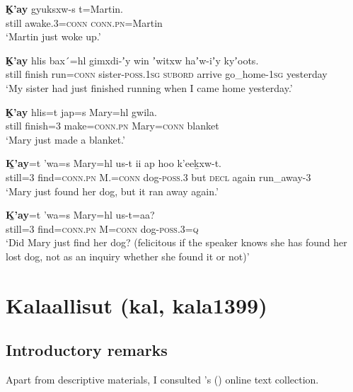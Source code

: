 \begin{exe}
	\ex\label{exGitsxanNearPast1}
	\gll \textbf{K̠'ay} gyuksxw-s t=Martin.\\
	still awake.3=\textsc{conn} \textsc{conn}.\textsc{pn}=Martin\\
	\glt \lq Martin just woke up.' \parencite[140]{Hunt1993}

	\ex\label{exGitsxanNearPast2}
	\gll \textbf{K̠'ay} hlis bax´=hl gimxdi-ʼy win ʼwitxw haʼw-iʼy kyʼoots.\\
	still finish run=\textsc{conn} sister-\textsc{poss}.1\textsc{sg} \textsc{subord} arrive go\_home-1\textsc{sg} yesterday\\
	\glt \lq My sister had just finished running when I came home yesterday.' \parencite[69]{Aonuki2021}
	
	\ex\label{exGitsxanNearPast3}
	\gll \textbf{K̠'ay} hlis=t jap=s Mary=hl gwila.\\
	still finish=3 make=\textsc{conn}.\textsc{pn} Mary=\textsc{conn} blanket\\
	\glt \lq Mary just made a blanket.'  \parencite[69]{Aonuki2021}
	
	\ex\label{exGitsxanNearPast4}
	\gll \textbf{Ḵ’ay}=t ’wa=s Mary=hl us-t ii ap hoo k’eeḵxw-t.\\
	still=3 find=\textsc{conn}.\textsc{pn} M.=\textsc{conn} dog-\textsc{poss}.3 but \textsc{decl} again run\_away-3\\
	\glt \lq Mary just found her dog, but it ran away again.’  \parencite[69]{Aonuki2021}
	
	\ex\label{exGitsxanNearPast5}
	\gll \textbf{Ḵ’ay}=t ’wa=s Mary=hl us-t=aa?\\
	still=3 find=\textsc{conn}.\textsc{pn} M=\textsc{conn} dog-\textsc{poss}.3=\textsc{q}\\
	\glt \lq Did Mary just find her dog? (felicitous if the speaker knows she has found her lost dog, not as an inquiry whether she found it or not)' \parencite[71]{Aonuki2021}
\end{exe}

\section{Kalaallisut (kal, kala1399)}\label{appendixGreenlandic}

\subsection{Introductory remarks}
Apart from descriptive materials, I consulted \citeauthor{BittnerTexts}'s (\citeyear{BittnerTexts}) online text collection.

